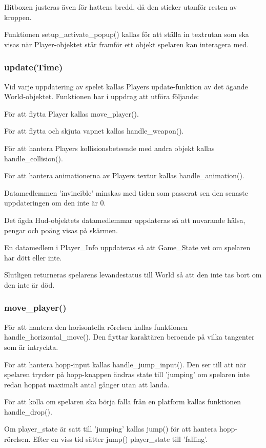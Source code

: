 \documentclass{TDP005mall}
\begin{document}
Hitboxen justeras även för hattens bredd, då den sticker utanför resten av kroppen.

Funktionen setup\_activate\_popup() kallas för att ställa in textrutan som ska visas när Player-objektet står framför ett objekt spelaren kan interagera med. 

\subsubsection{update(Time)}
Vid varje uppdatering av spelet kallas Players update-funktion av det ägande World-objektet. Funktionen har i uppdrag att utföra följande:

För att flytta Player kallas move\_player().

För att flytta och skjuta vapnet kallas handle\_weapon().

För att hantera Players kollisionsbeteende med andra objekt kallas handle\_collision().

För att hantera animationerna av Players textur kallas handle\_animation().

Datamedlemmen 'invincible' minskas med tiden som passerat sen den senaste uppdateringen om den inte är 0.

Det ägda Hud-objektets datamedlemmar uppdateras så att nuvarande hälsa, pengar och poäng visas på skärmen. 

En datamedlem i Player\_Info uppdateras så att Game\_State vet om spelaren har dött eller inte.

Slutligen returneras spelarens levandestatus till World så att den inte tas bort om den inte är död.

\subsubsection{move\_player()}
För att hantera den horisontella rörelsen kallas funktionen handle\_horizontal\_move().
Den flyttar karaktären beroende på vilka tangenter som är intryckta.

För att hantera hopp-input kallas handle\_jump\_input().
Den ser till att när spelaren trycker på hopp-knappen ändras state till 'jumping' om spelaren inte redan hoppat maximalt antal gånger utan att landa. 

För att kolla om spelaren ska börja falla från en platform kallas funktionen handle\_drop().

Om player\_state är satt till 'jumping' kallas jump() för att hantera hopp-rörelsen.
Efter en viss tid sätter jump() player\_state till 'falling'.
\end{document}
